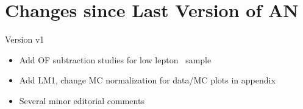 \section{Changes since Last Version of AN}
\label{sec:changes}

\item Version v1
\begin{itemize}
\item Add OF subtraction studies for low lepton \pt\ sample
\item Add LM1, change MC normalization for data/MC plots in appendix
\item Several minor editorial comments
\end{itemize}
